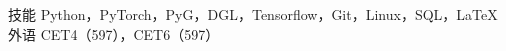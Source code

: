 \begin{cvskills}
  \cvskill
    {技能} %
    {Python，PyTorch，PyG，DGL，Tensorflow，Git，Linux，SQL，\LaTeX} %
  \cvskill
    {外语} %
    {CET4（597），CET6（597）} %
\end{cvskills}
